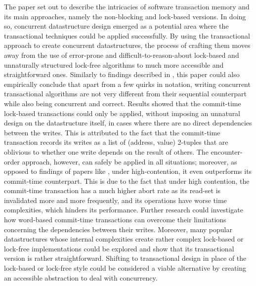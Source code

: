 The paper set out to describe the intricacies of software transaction memory and its main approaches, namely the non-blocking and lock-based versions. In doing so, concurrent datastructure design emerged as a potential area where the transactional techniques could be applied successfully. By using the transactional approach to create concurrent datastructures, the process of crafting them moves away from the use of error-prone and difficult-to-reason-about lock-based and unnaturally structured lock-free algorithms to much more accessible and straightforward ones. Similarly to findings described in \cite{is-tx-easier}, this paper could also empirically conclude that apart from a few quirks in notation, writing concurrent transactional algorithms are not very different from their sequential counterpart while also being concurrent and correct. Results showed that the commit-time lock-based transactions could only be applied, without imposing an unnatural design on the datastructure itself, in cases where there are no direct dependencies between the writes. This is attributed to the fact that the commit-time transaction records its writes as a list of (address, value) 2-tuples that are oblivious to whether one write depends on the result of others. The encounter-order approach, however, can safely be applied in all situations; moreover, as opposed to findings of papers like \cite{tl, tl2}, under high-contention, it even outperforms its commit-time counterpart. This is due to the fact that under high contention, the commit-time transaction has a much higher abort rate as its read-set is invalidated more and more frequently, and its operations have worse time complexities, which hinders its performance. Further research could investigate how word-based commit-time transactions can overcome their limitations concerning the dependencies between their writes. Moreover, many popular datastructures whose internal complexities create rather complex lock-based or lock-free implementations could be explored and show that its transactional version is rather straightforward. Shifting to transactional design in place of the lock-based or lock-free style could be considered a viable alternative by creating an accessible abstraction to deal with concurrency.